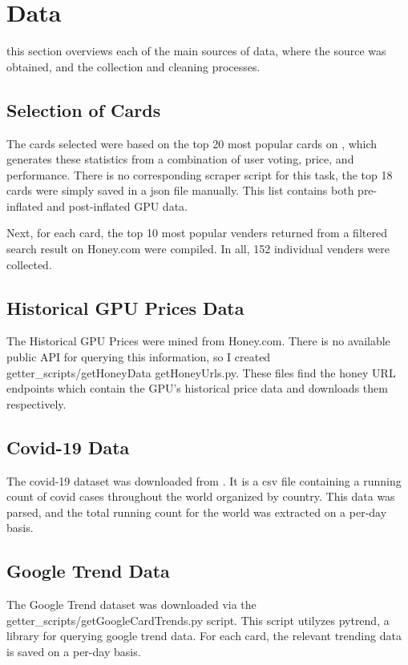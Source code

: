 \documentclass[twocolumn]{article}
\begin{document}
\section{Data}
this section overviews each of the main sources of data, where the source was obtained, and the collection and cleaning processes.

\subsection{Selection of Cards}
The cards selected were based on the top 20 most popular cards on \cite{userBenchmark}, which generates these statistics from a combination of user voting, price, and performance. There is no corresponding scraper script for this task, the top 18 cards were simply saved in a json file manually. This list contains both pre-inflated and post-inflated GPU data.

Next, for each card, the top 10 most popular venders returned from a filtered search result on Honey.com were compiled. In all, 152 individual venders were collected.

\subsection{Historical GPU Prices Data}
The Historical GPU Prices were mined from Honey.com. There is no available public API for querying this information, so I created getter\_scripts/{getHoneyData getHoneyUrls}.py. These files find the honey URL endpoints which contain the GPU's historical price data and downloads them respectively.

\subsection{Covid-19 Data}
The covid-19 dataset was downloaded from \cite{covid}. It is a csv file containing a running count of covid cases throughout the world organized by country. This data was parsed, and the total running count for the world was extracted on a per-day basis.

\subsection{Google Trend Data}
The Google Trend dataset was downloaded via the getter\_scripts/getGoogleCardTrends.py script. This script utilyzes pytrend, a library for querying google trend data. For each card, the relevant trending data is saved on a per-day basis.
\end{document}
